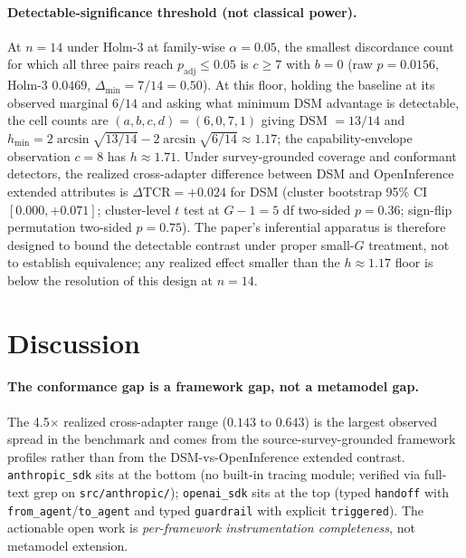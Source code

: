 \documentclass[a4paper,UKenglish,cleveref,autoref,thm-restate]{lipics-v2021}
\begin{document}
\paragraph*{Detectable-significance threshold (not classical power).}
\label{sec:rq3-power}
At $n = 14$ under Holm-3 at family-wise $\alpha = 0.05$, the smallest
discordance count for which all three pairs reach
$p_{\text{adj}} \leq 0.05$ is $c \geq 7$ with $b = 0$ (raw
$p = 0.0156$, Holm-3 $0.0469$, $\Delta_{\min} = 7/14 = 0.50$). At
this floor, holding the baseline at its observed marginal $6/14$
and asking what minimum DSM advantage is detectable, the cell
counts are $(a, b, c, d) = (6, 0, 7, 1)$ giving DSM $= 13/14$ and
$h_{\min} = 2\arcsin\sqrt{13/14} - 2\arcsin\sqrt{6/14} \approx
1.17$; the capability-envelope observation $c = 8$ has $h \approx
1.71$. Under survey-grounded coverage and conformant detectors,
the realized cross-adapter difference between DSM and OpenInference
extended attributes is $\Delta\text{TCR} = +0.024$ for DSM (cluster
bootstrap 95\% CI $[0.000, +0.071]$; cluster-level $t$ test at $G - 1 = 5$ df
two-sided $p = 0.36$; sign-flip permutation two-sided $p = 0.75$).
The paper's inferential apparatus is therefore designed to bound the
detectable contrast under proper small-$G$ treatment, not to establish
equivalence; any realized effect smaller than the
$h \approx 1.17$ floor is below the resolution of this design at
$n = 14$.

\section{Discussion}
\label{sec:discussion}
\label{sec:permissive}

\paragraph*{The conformance gap is a framework gap, not a metamodel gap.}
The 4.5$\times$ realized cross-adapter range ($0.143$ to $0.643$)
is the largest observed spread in the benchmark and comes from the
source-survey-grounded framework profiles rather than from the
DSM-vs-OpenInference extended contrast. \texttt{anthropic\_sdk} sits at the bottom (no built-in
tracing module; verified via full-text grep on \texttt{src/anthropic/});
\texttt{openai\_sdk} sits at the top (typed \texttt{handoff} with
\texttt{from\_agent}/\texttt{to\_agent} and typed \texttt{guardrail}
with explicit \texttt{triggered}). The actionable open work is
\emph{per-framework instrumentation completeness}, not metamodel
extension.
\end{document}
